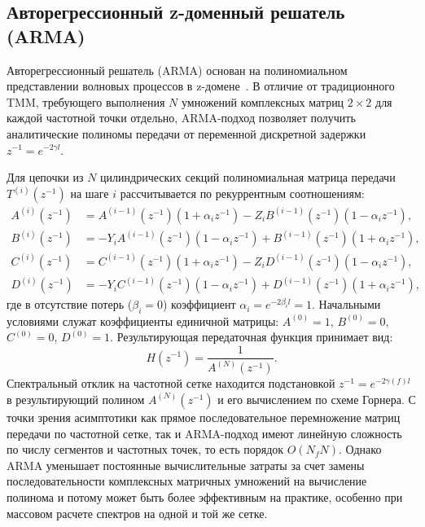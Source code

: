 \subsection{Авторегрессионный z-доменный решатель (ARMA)}
\label{subsec:arma_solver}

Авторегрессионный решатель (ARMA) основан на полиномиальном представлении волновых процессов в z-домене~\cite{makarov2011}. В отличие от традиционного TMM, требующего выполнения $N$ умножений комплексных матриц $2 \times 2$ для каждой частотной точки отдельно, ARMA-подход позволяет получить аналитические полиномы передачи от переменной дискретной задержки $z^{-1} = e^{-2\gamma l}$.

Для цепочки из $N$ цилиндрических секций полиномиальная матрица передачи $T^{(i)}(z^{-1})$ на шаге $i$ рассчитывается по рекуррентным соотношениям:
\begin{align}
    A^{(i)}(z^{-1}) &= A^{(i-1)}(z^{-1})(1 + \alpha_i z^{-1}) - Z_i B^{(i-1)}(z^{-1})(1 - \alpha_i z^{-1}), \\
    B^{(i)}(z^{-1}) &= -Y_i A^{(i-1)}(z^{-1})(1 - \alpha_i z^{-1}) + B^{(i-1)}(z^{-1})(1 + \alpha_i z^{-1}), \\
    C^{(i)}(z^{-1}) &= C^{(i-1)}(z^{-1})(1 + \alpha_i z^{-1}) - Z_i D^{(i-1)}(z^{-1})(1 - \alpha_i z^{-1}), \\
    D^{(i)}(z^{-1}) &= -Y_i C^{(i-1)}(z^{-1})(1 - \alpha_i z^{-1}) + D^{(i-1)}(z^{-1})(1 + \alpha_i z^{-1}),
\end{align}
где в отсутствие потерь ($\beta_i = 0$) коэффициент $\alpha_i = e^{-2\beta_i l} = 1$. Начальными условиями служат коэффициенты единичной матрицы: $A^{(0)} = 1$, $B^{(0)} = 0$, $C^{(0)} = 0$, $D^{(0)} = 1$. Результирующая передаточная функция принимает вид:
\begin{equation}
    H(z^{-1}) = \frac{1}{A^{(N)}(z^{-1})}.
    \label{eq:arma_tf}
\end{equation}
Спектральный отклик на частотной сетке находится подстановкой $z^{-1} = e^{-2\gamma(f) l}$ в результирующий полином $A^{(N)}(z^{-1})$ и его вычислением по схеме Горнера. С точки зрения асимптотики как прямое последовательное перемножение матриц передачи по частотной сетке, так и ARMA-подход имеют линейную сложность по числу сегментов и частотных точек, то есть порядок $O(N_f N)$. Однако ARMA уменьшает постоянные вычислительные затраты за счет замены последовательности комплексных матричных умножений на вычисление полинома и потому может быть более эффективным на практике, особенно при массовом расчете спектров на одной и той же сетке.

